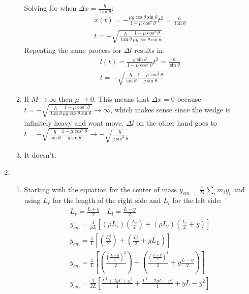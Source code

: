 \documentclass[12pt]{article}
\begin{document}
\begin{enumerate}
\begin{enumerate}
            Solving for when $\Delta x=\frac{h}{\tan\theta}$:
            \begin{gather}
                x(t)=-\frac{\mu g\cos\theta\sin\theta}{ 1-\mu\cos^2\theta}t^2=\frac{h}{\tan\theta}\\
                t=-\sqrt{\frac{h}{\tan\theta}\frac{ 1-\mu\cos^2\theta}{\mu g\cos\theta\sin\theta}}
            \end{gather}
            Repeating the same process for $\Delta l$ results in:
            \begin{gather}
                l(t)=\frac{g\sin\theta}{1-\mu\cos^2\theta}t^2=\frac{h}{\sin\theta}\\
                t=-\sqrt{\frac{h}{\sin\theta}\frac{1-\mu\cos^2\theta}{g\sin\theta}}
            \end{gather}
            \item
            If $M\rightarrow\infty$ then $\mu\rightarrow0$.
            This means that  $\Delta x=0$ because $t=-\sqrt{\frac{h}{\tan\theta}\frac{ 1-\mu\cos^2\theta}{\mu g\cos\theta\sin\theta}}\rightarrow\infty$, which makes sense since the wedge is infinitely heavy and wont move.
            $\Delta l$ on the other hand goes to $t=-\sqrt{\frac{h}{\sin\theta}\frac{1-\mu\cos^2\theta}{g\sin\theta}}\rightarrow-\sqrt{\frac{h}{g\sin^2\theta}}$
            \item It doesn't.
        \end{enumerate}
        \item
        \begin{enumerate}
            \item
            Starting with the equation for the center of mass $y_{cm}=\frac{1}{M}\sum_i m_i y_i$ and using $L_r$ for the length of the right side and $L_l$ for the left side:
            \begin{gather}
                L_r=\frac{L+y}{2}\quad L_l=\frac{L-y}{2}\\
                y_{cm}=\frac{1}{\rho L}\left[ (\rho L_r)\left(\frac{L_r}{2}\right) +(\rho L_l)\left(\frac{L_l}{2}+y\right) \right]\\
                y_{cm}=\frac{1}{L}\left[ \left(\frac{L_r^2}{2}\right) +\left(\frac{L_l^2}{2}+yL_L\right) \right]\\
                y_{cm}=\frac{1}{L}\left[ \left(\frac{\left(\frac{L+y}{2}\right)^2}{2}\right) +\left(\frac{\left( \frac{L-y}{2} \right)^2}{2}+y\frac{L-y}{2}\right) \right]\\
                y_{cm}=\frac{1}{2L}\left[ \frac{L^2+2yL+y^2}{4} +\frac{L^2-2yL+y^2}{4}+yL-y^2\right]\\

\end{gather}
\end{enumerate}
\end{enumerate}
\end{document}

